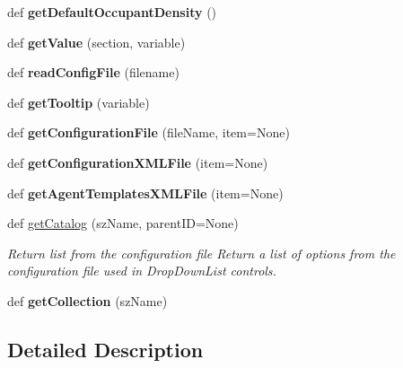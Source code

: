 \begin{DoxyCompactItemize}
def {\bfseries get\+Default\+Occupant\+Density} ()
\item 
\mbox{\label{class_c_utils_1_1_utils_1_1_config_aaa46b72d973895fae7396bd7a676a9af}} 
def {\bfseries get\+Value} (section, variable)
\item 
\mbox{\label{class_c_utils_1_1_utils_1_1_config_a5df63f478e7412f05fd4341442d576f6}} 
def {\bfseries read\+Config\+File} (filename)
\item 
\mbox{\label{class_c_utils_1_1_utils_1_1_config_a9c45e7f8346de6e1c36bfec816b5ad42}} 
def {\bfseries get\+Tooltip} (variable)
\item 
\mbox{\label{class_c_utils_1_1_utils_1_1_config_a18fac3cac1d6e67a4d6bc52f062fd54e}} 
def {\bfseries get\+Configuration\+File} (file\+Name, item=None)
\item 
\mbox{\label{class_c_utils_1_1_utils_1_1_config_a17726dc36065d2005bdc7c6df88d84ad}} 
def {\bfseries get\+Configuration\+X\+M\+L\+File} (item=None)
\item 
\mbox{\label{class_c_utils_1_1_utils_1_1_config_adeed3667616049a8d07e4ff6d0014bd3}} 
def {\bfseries get\+Agent\+Templates\+X\+M\+L\+File} (item=None)
\item 
def \hyperlink{class_c_utils_1_1_utils_1_1_config_a5e35e2165f66806e4eeb919eb148490b}{get\+Catalog} (sz\+Name, parent\+ID=None)
\begin{DoxyCompactList}\small\item\em Return list from the configuration file Return a list of options from the configuration file used in Drop\+Down\+List controls. \end{DoxyCompactList}\item 
\mbox{\label{class_c_utils_1_1_utils_1_1_config_a20fa88fb99a7d1fe306a2b4aae7d5c15}} 
def {\bfseries get\+Collection} (sz\+Name)
\end{DoxyCompactItemize}


\subsection{Detailed Description}



